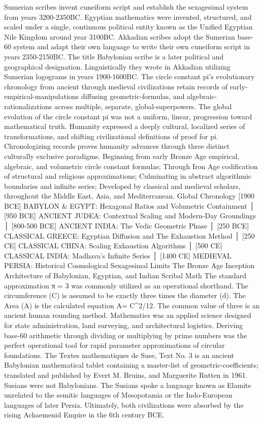Sumerian scribes invent cuneiform script and establish the sexagesimal system from years 3200-2350BC. Egyptian mathematics were invented, structured, and scaled under a single, continuous political entity known as the Unified Egyptian Nile Kingdom around year 3100BC. Akkadian scribes adopt the Sumerian base-60 system and adapt their own language to write their own cuneiform script in years 2350-2150BC. The title Babylonian scribe is a later political and geographical designation. Linguistically they wrote in Akkadian utilizing Sumerian logograms in years 1900-1600BC. The circle constant pi’s evolutionary chronology from ancient through medieval civilizations retain records of early-empirical-manipulations diffusing geometric-formulas, and algebraic-rationalizations across multiple, separate, global-superpowers. The global evolution of the circle constant pi was not a uniform, linear, progression toward mathematical truth. Humanity expressed a deeply cultural, localized series of transformations, and shifting civilizational definitions of proof for pi. Chronologizing records proves humanity advances through three distinct culturally exclusive paradigms. Beginning from early Bronze Age empirical, algebraic, and volumetric circle constant formulas; Through Iron Age codification of structural and religious approximations; Culminating in abstract algorithmic boundaries and infinite series; Developed by classical and medieval scholars, throughout the Middle East, Asia, and Mediterranean.
Global Chronology
 [1900 BCE] BABYLON & EGYPT: Hexagonal Ratios and Volumetric Containment 
       │
 [950 BCE] ANCIENT JUDEA: Contextual Scaling and Modern-Day Groundings
       │
 [800-500 BCE] ANCIENT INDIA: The Vedic Geometric Phase
       │ 
 [250 BCE] CLASSICAL GREECE: Egyptian Diffusion and The Exhaustion Method
       │
 [250 CE] CLASSICAL CHINA: Scaling Exhaustion Algorithms
       │
 [500 CE] CLASSICAL INDIA: Madhava’s Infinite Series
       │
 [1400 CE] MEDIEVAL PERSIA: Historical Cosmological Sexagesimal Limits
The Bronze Age Inception
Architecture of Babylonian, Egyptian, and Indian Scribal Math
The standard approximation π = 3 was commonly utilized as an operational shorthand. The circumference (C) is assumed to be exactly three times the diameter (d). The Area (A) is the calculated equation A= C^2/12. The common value of three is an ancient human rounding method. Mathematics was an applied science designed for state administration, land surveying, and architectural logistics. Deriving base-60 arithmetic through dividing or multiplying by prime numbers was the perfect operational tool for rapid parameter approximations of circular foundations. The Textes mathematiques de Suse, Text No. 3 is an ancient Babylonian mathematical tablet containing a master-list of geometric-coefficients; translated and published by Evert M. Bruins, and Marguerite Rutten in 1961. Susians were not Babylonians. The Susians spoke a language known as Elamite unrelated to the semitic languages of Mesopotamia or the Indo-European languages of later Persia. Ultimately, both civilizations were absorbed by the rising Achaemenid Empire in the 6th century BCE.
